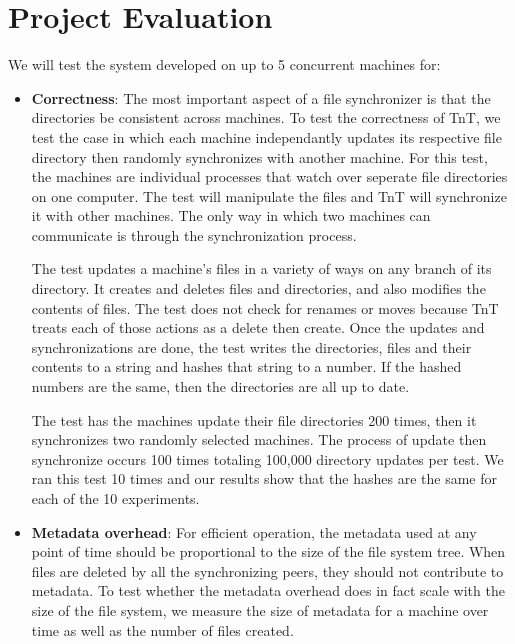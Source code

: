 \section{Project Evaluation}

We will test the system developed on up to 5 concurrent machines for:

\begin{itemize}\renewcommand{\labelitemi}{$\diamond$}
\item {\bf Correctness}: The most important aspect of a file synchronizer is that the directories be consistent across machines.  To test the correctness of TnT, we test the case in which each machine independantly updates its respective file directory then randomly synchronizes with another machine.  For this test, the machines are individual processes that watch over seperate file directories on one computer.  The test will manipulate the files and TnT will synchronize it with other machines.  The only way in which two machines can communicate is through the synchronization process.

The test updates a machine's files in a variety of ways on any branch of its directory.  It creates and deletes files and directories, and also modifies the contents of files.  The test does not check for renames or moves because TnT treats each of those actions as a delete then create.  Once the updates and synchronizations are done, the test writes the directories, files and their contents to a string and hashes that string to a number.  If the hashed numbers are the same, then the directories are all up to date.

The test has the machines update their file directories 200 times, then it synchronizes two randomly selected machines.  The process of update then synchronize occurs 100 times totaling 100,000 directory updates per test.  We ran this test 10 times and our results show that the hashes are the same for each of the 10 experiments.


\item {\bf Metadata overhead}: For efficient operation, the metadata used at any point of time should be proportional to the size of the file system tree. When files are deleted by all the synchronizing peers, they should not contribute to metadata.  To test whether the metadata overhead does in fact scale with the size of the file system, we measure the size of metadata for a machine over time as well as the number of files created.  


\end{itemize}

